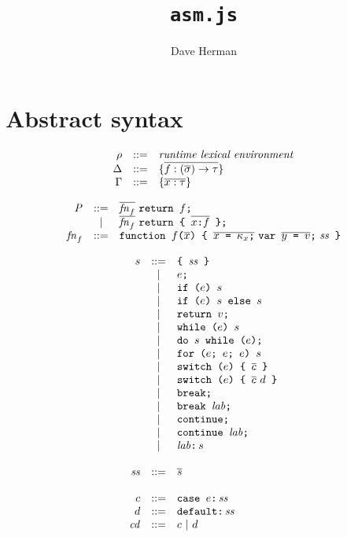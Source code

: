 \documentclass{article}
\newcommand{\funty}[2]{({#1}) \rightarrow {#2}}
\newcommand{\seq}[1]{\overline{{#1}}}
\newcommand{\mathjs}[1]{\mbox{\texttt{{#1}}}}
\newcommand{\return}[1]{\mathjs{return }{#1}\mathjs{;}}
\newcommand{\fun}[3]{\mathjs{function }{#1}\mathjs{(}{#2}\mathjs{) \{ }{#3}\mathjs{ \}}}
\newcommand{\var}[1]{\mathjs{var }{#1}\mathjs{;}}
\newcommand{\while}[2]{\mathjs{while (}{#1}\mathjs{) }{#2}}
\newcommand{\dowhile}[2]{\mathjs{do }{#1}\mathjs{ while (}{#2}\mathjs{);}}
\newcommand{\for}[4]{\mathjs{for (}{#1}\mathjs{; }{#2}\mathjs{; }{#3}\mathjs{) }{#4}}
\newcommand{\switch}[2]{\mathjs{switch (}{#1}\mathjs{) \{ }{#2}\mathjs{ \}}}
\newcommand{\brk}{\mathjs{break;}}
\newcommand{\brkl}[1]{\mathjs{break }{#1}\mathjs{;}}
\newcommand{\cont}{\mathjs{continue;}}
\newcommand{\contl}[1]{\mathjs{continue }{#1}\mathjs{;}}
\newcommand{\lab}[2]{{#1}\mathjs{:}\,{#2}}
\newcommand{\ifthen}[2]{\mathjs{if (}{#1}\mathjs{) }{#2}}
\newcommand{\ifthenelse}[3]{\mathjs{if (}{#1}\mathjs{) }{#2}\mathjs{ else }{#3}}
\newcommand{\block}[1]{\mathjs{\{ }{#1}\mathjs{ \}}}
\begin{document}
\title{\texttt{asm.js}}
\author{Dave Herman}
\maketitle

\section{Abstract syntax}

\[
\begin{array}{rcl}
\rho & ::= & \mbox{\textit{runtime lexical environment}} \\
\Delta & ::= & \{ \seq{f : \funty{\seq{\sigma}}{\tau} } \} \\
\Gamma & ::= & \{ \seq{x : \tau} \} \\
\end{array}
\]

\[
\begin{array}{rcl}
\mathit{P}    & ::= & \seq{\mathit{fn}_f}\ \return{f} \\
              &  |  & \seq{\mathit{fn}_f}\ \return{\mathjs{\{ } \seq{x \mathjs{:} f} \mathjs{ \}}} \\
\mathit{fn}_f & ::= & \fun{f}{\seq{x}}{\seq{x\mathjs{ = }\kappa_x\mathjs{;}}\ \var{\seq{y\mathjs{ = }v}}\ \mathit{ss}} \\
\end{array}
\]

\[
\begin{array}{rcl}
s & ::= & \block{\mathit{ss}} \\
  &  |  & e\mathjs{;} \\
  &  |  & \ifthen{e}{s} \\
  &  |  & \ifthenelse{e}{s}{s} \\
  &  |  & \return{v} \\
  &  |  & \while{e}{s} \\
  &  |  & \dowhile{s}{e} \\
  &  |  & \for{e}{e}{e}{s} \\
  &  |  & \switch{e}{\seq{c}} \\
  &  |  & \switch{e}{\seq{c}\ d} \\
  &  |  & \brk \\
  &  |  & \brkl{\mathit{lab}} \\
  &  |  & \cont \\
  &  |  & \contl{\mathit{lab}} \\
  &  |  & \lab{\mathit{lab}}{s} \\
\\
\mathit{ss} & ::= & \seq{s} \\
\\
c & ::= & \mathjs{case }e\mathjs{:}\,\mathit{ss} \\
d & ::= & \mathjs{default:}\,\mathit{ss} \\
\mathit{cd} & ::= & c ~|~ d \\
\end{array}
\]
\end{document}
